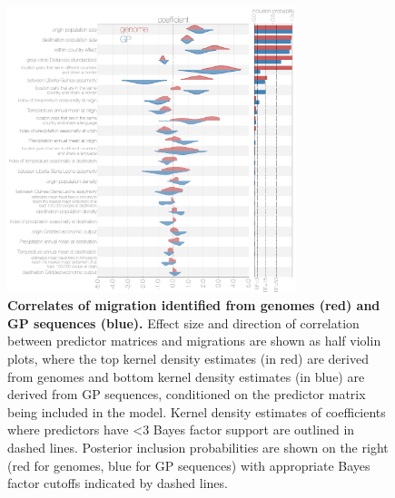 \documentclass[11pt,oneside,letterpaper]{article}
\begin{document}
\begin{figure}[ht]
 \centering
	\includegraphics[width=0.75\textwidth]{figures/fig4_glm.png}
	\caption{\textbf{Correlates of migration identified from genomes (red) and GP sequences (blue).}
  Effect size and direction of correlation between predictor matrices and migrations are shown as half violin plots, where the top kernel density estimates (in red) are derived from genomes and bottom kernel density estimates (in blue) are derived from GP sequences, conditioned on the predictor matrix being included in the model.
  Kernel density estimates of coefficients where predictors have <3 Bayes factor support are outlined in dashed lines.
  Posterior inclusion probabilities are shown on the right (red for genomes, blue for GP sequences) with appropriate Bayes factor cutoffs indicated by dashed lines.
	}
	\label{glm}
\end{figure}
\end{document}
